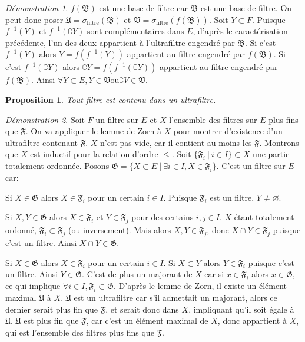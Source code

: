 \documentclass[a4paper, 11pt, french]{book}
\newenvironment{itemise}{\itemize}{\enditemize}
\theoremstyle{plain} %
\newtheorem{proposition}{Proposition}
\theoremstyle{definition} %
\theoremstyle{remark} %
\newtheorem*{demonstration}{Démonstration}
\newcommand{\1}{\mathds{1}}
\newcommand\vide{\varnothing}
\newcommand{\inv}[1]{#1^{-1}}
\newcommand{\ou}{\mathrel{\mathrm{ou}}}
\renewcommand{\frak}[1]{\mathfrak{#1}}
\renewcommand{\rm}[1]{\mathrm{#1}}
\newcommand\ens[2]{\{#1 \ |\ #2\}}
\begin{document}
\begin{demonstration}
	$f(\frak{B})$ est une base de filtre car $\frak{B}$ est une base de filtre.
	On peut donc poser $\frak{U}=\sigma_\rm{filtre}(\frak{B})$ et $\frak{V}=\sigma_\rm{filtre}(f(\frak{B}))$.
	Soit $Y\subset F$.
	Puisque $\inv{f}(Y)$ et $\inv{f}(\complement Y)$ sont complémentaires dans $E$, d'après le caractérisation précédente, l'un des deux appartient à l'ultrafiltre engendré par $\frak{B}$.
	Si c'est $\inv{f}(Y)$ alors $Y=f(\inv{f}(Y))$ appartient au filtre engendré par $f(\frak{B})$.
	Si c'est $\inv{f}(\complement Y)$ alors $\complement Y=f(\inv{f}(\complement Y))$ appartient au filtre engendré par $f(\frak{B})$.
	Ainsi $\forall Y\subset E, Y\in\frak{V}\ou\complement V\in\frak{V}$.
\end{demonstration}

\begin{proposition}
	Tout filtre est contenu dans un ultrafiltre.
\end{proposition}

\begin{demonstration}
	Soit $F$ un filtre sur $E$ et $X$ l'ensemble des filtres sur $E$ plus fins que $\frak{F}$.
	On va appliquer le lemme de Zorn à $X$ pour montrer d'existence d'un ultrafiltre contenant $\frak{F}$.
	$X$ n'est pas vide, car il contient au moins les $\frak{F}$.
	Montrons que $X$ est inductif pour la relation d'ordre $\leqslant$.
	Soit $\ens{\frak{F}_i}{i\in I}\subset X$ une partie totalement ordonnée.
	Posons $\frak{G}=\ens{X\subset E}{\exists i\in I, X\in\frak{F}_i}$.
	C'est un filtre sur $E$ car:
	\begin{itemise}
		\item Si $X\in\frak{G}$ alors $X\in\frak{F}_i$ pour un certain $i\in I$.
		Puisque $\frak{F}_i$ est un filtre, $Y\neq\vide$.
		\item Si $X, Y\in\frak{G}$ alors $X\in\frak{F}_i$ et $Y\in\frak{F}_j$ pour des certains $i, j\in I$.
		$X$ étant totalement ordonné, $\frak{F}_i\subset\frak{F}_j$ (ou inversement).
		Mais alors $X, Y\in\frak{F}_j$, donc $X\cap Y\in\frak{F}_j$ puisque c'est un filtre.
		Ainsi $X\cap Y\in\frak{G}$.
		\item Si $X\in\frak{G}$ alors $X\in\frak{F}_i$ pour un certain $i\in I$.
		Si $X\subset Y$ alors $Y\in\frak{F}_i$ puisque c'est un filtre.
		Ainsi $Y\in\frak{G}$.
	\end{itemise}
	C'est de plus un majorant de $X$ car si $x\in\frak{F}_i$ alors $x\in\frak{G}$, ce qui implique $\forall i\in I, \frak{F}_i\subset\frak{G}$.
	D'après le lemme de Zorn, il existe un élément maximal $\frak{U}$ à $X$.
	$\frak{U}$ est un ultrafiltre car s'il admettait un majorant, alors ce dernier serait plus fin que $\frak{F}$, et serait donc dans $X$, impliquant qu'il soit égale à $\frak{U}$.
	$\frak{U}$ est plus fin que $\frak{F}$, car c'est un élément maximal de $X$, donc appartient à $X$, qui est l'ensemble des filtres plus fins que $\frak{F}$.
\end{demonstration}
\end{document}

